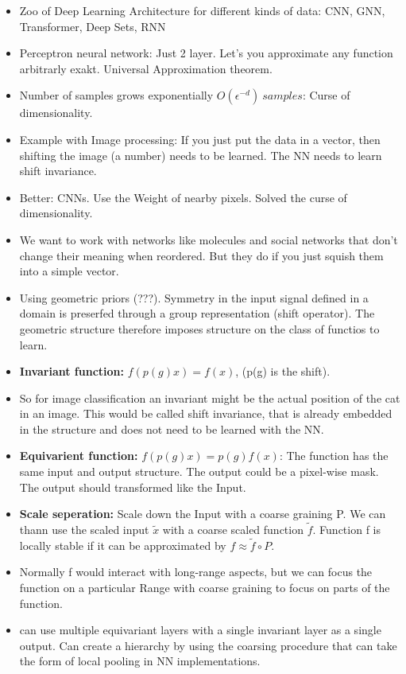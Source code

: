 \begin{itemize}[noitemsep,nolistsep]
	\item Zoo of Deep Learning Architecture for different kinds of data: CNN, GNN, Transformer, Deep Sets, RNN
	\item Perceptron neural network: Just 2 layer. Let's you approximate any function arbitrarly exakt. Universal Approximation theorem.
	\item Number of samples grows exponentially $O(\epsilon^{-d})\ samples$: Curse of dimensionality.
	\item Example with Image processing: If you just put the data in a vector, then shifting the image (a number) needs to be learned. The NN needs to learn shift invariance.
	\item Better: CNNs. Use the Weight of nearby pixels. Solved the curse of dimensionality.
	\item We want to work with networks like molecules and social networks that don't change their meaning when reordered. But they do if you just squish them into a simple vector.
	\item Using geometric priors (???). Symmetry in the input signal defined in a domain is preserfed through a group representation (shift operator). The geometric structure therefore imposes structure on the class of functios to learn. 
	\item \textbf{Invariant function:} $f(p(g)x)=f(x)$, (p(g) is the shift).
	\item So for image classification an invariant might be the actual position of the cat in an image. This would be called shift invariance, that is already embedded in the structure and does not need to be learned with the NN.
	\item \textbf{Equivarient function:} $f(p(g)x) = p(g)f(x)$: The function has the same input and output structure. The output could be a pixel-wise mask. The output should transformed like the Input.
	\item \textbf{Scale seperation:} Scale down the Input with a coarse graining P. We can thann use the scaled input $\tilde{x}$ with a coarse scaled function $\tilde{f}$. Function f is locally stable if it can be approximated by $f \approx \tilde{f} \circ P$.
	\item Normally f would interact with long-range aspects, but we can focus the function on a particular Range with coarse graining to focus on parts of the function.
	\item can use multiple equivariant layers with a single invariant layer as a single output. Can create a hierarchy by using the coarsing procedure that can take the form of local pooling in NN implementations.

\end{itemize}
